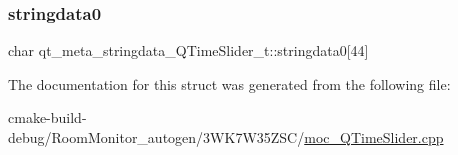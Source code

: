 \subsubsection{\texorpdfstring{stringdata0}{stringdata0}}
{\footnotesize\ttfamily char qt\+\_\+meta\+\_\+stringdata\+\_\+\+Q\+Time\+Slider\+\_\+t\+::stringdata0\mbox{[}44\mbox{]}}



The documentation for this struct was generated from the following file\+:\begin{DoxyCompactItemize}
\item 
cmake-\/build-\/debug/\+Room\+Monitor\+\_\+autogen/3\+W\+K7\+W35\+Z\+S\+C/\hyperlink{moc___q_time_slider_8cpp}{moc\+\_\+\+Q\+Time\+Slider.\+cpp}\end{DoxyCompactItemize}
